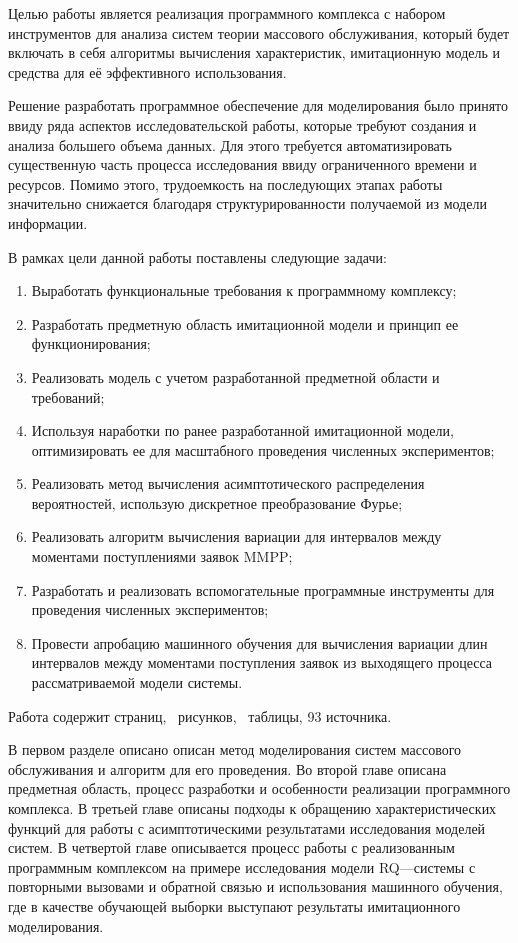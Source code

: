  Целью работы является реализация программного комплекса с набором инструментов для анализа систем теории массового обслуживания, который будет включать в себя алгоритмы вычисления характеристик, имитационную модель и средства для её эффективного использования.

Решение разработать программное обеспечение для моделирования было принято ввиду ряда аспектов исследовательской работы, которые требуют создания и анализа большего объема данных. Для этого требуется автоматизировать существенную часть процесса исследования ввиду ограниченного времени и ресурсов. Помимо этого, трудоемкость на последующих этапах работы значительно снижается благодаря структурированности получаемой из модели информации.

В рамках цели данной работы поставлены следующие задачи:
\begin{enumerate}
	\item Выработать функциональные требования к программному комплексу;
	\item Разработать предметную область имитационной модели и принцип ее функционирования;
	\item Реализовать модель с учетом разработанной предметной области и требований;
	\item Используя наработки по ранее разработанной имитационной модели, оптимизировать ее для масштабного проведения численных экспериментов;
	\item Реализовать метод вычисления асимптотического распределения вероятностей, использую дискретное преобразование Фурье;
	\item Реализовать алгоритм вычисления вариации для интервалов между моментами поступлениями заявок MMPP;
	\item Разработать и реализовать вспомогательные программные инструменты для проведения численных экспериментов;
	\item Провести апробацию машинного обучения для вычисления вариации длин интервалов между моментами поступления заявок из выходящего процесса рассматриваемой модели системы.
\end{enumerate}

Работа содержит \pageref{LastPage} страниц, \totalfigures\ рисунков, \totaltables\ таблицы, 93 источника.

В первом разделе описано описан метод моделирования систем массового обслуживания и алгоритм для его проведения. Во второй главе описана предметная область, процесс разработки и особенности реализации программного комплекса. В третьей главе описаны подходы к обращению характеристических функций для работы с асимптотическими результатами исследования моделей систем. В четвертой главе описывается процесс работы с реализованным программным комплексом на примере исследования модели RQ---системы с повторными вызовами и обратной связью и использования машинного обучения, где в качестве обучающей выборки выступают результаты имитационного моделирования.
 \clearpage
 